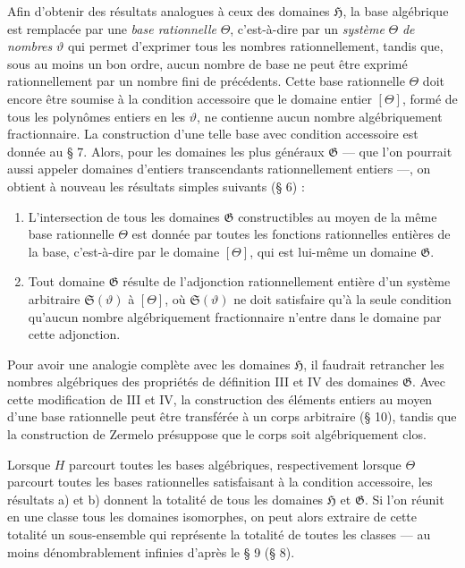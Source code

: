 Afin d'obtenir des résultats analogues à ceux des domaines $\mathfrak H$, la base algébrique est remplacée par une \emph{base rationnelle} $\Theta$, c'est-à-dire par un \emph{système} $\Theta$ \emph{de nombres} $\vartheta$ qui permet d'exprimer tous les nombres rationnellement, tandis que, sous au moins un bon ordre, aucun nombre de base ne peut être exprimé rationnellement par un nombre fini de précédents. Cette base rationnelle $\Theta$ doit encore être soumise à la condition accessoire que le domaine entier $[\Theta]$, formé de tous les polynômes entiers en les $\vartheta$, ne contienne aucun nombre algébriquement fractionnaire. La construction d'une telle base avec condition accessoire est donnée au \S{} 7. Alors, pour les domaines les plus généraux $\mathfrak G$ --- que l'on pourrait aussi appeler domaines d'entiers transcendants rationnellement entiers ---, on obtient à nouveau les résultats simples suivants (\S{} 6) :
\begin{enumerate}
\item[a)] L'intersection de tous les domaines $\mathfrak G$ constructibles au moyen de la même base rationnelle $\Theta$ est donnée par toutes les fonctions rationnelles entières de la base, c'est-à-dire par le domaine $[\Theta]$, qui est lui-même un domaine $\mathfrak G$.
\item[b)] Tout domaine $\mathfrak G$ résulte de l'adjonction rationnellement entière d'un système arbitraire $\mathfrak S(\vartheta)$ à $[\Theta]$, où $\mathfrak S(\vartheta)$ ne doit satisfaire qu'à la seule condition qu'aucun nombre algébriquement fractionnaire n'entre dans le domaine par cette adjonction.
\end{enumerate}

Pour avoir une analogie complète avec les domaines $\mathfrak H$, il faudrait retrancher les nombres algébriques des propriétés de définition III et IV des domaines $\mathfrak G$. Avec cette modification de III et IV, la construction des éléments entiers au moyen d'une base rationnelle peut être transférée à un corps arbitraire (\S{} 10), tandis que la construction de Zermelo présuppose que le corps soit algébriquement clos.

Lorsque $H$ parcourt toutes les bases algébriques, respectivement lorsque $\Theta$ parcourt toutes les bases rationnelles satisfaisant à la condition accessoire, les résultats a) et b) donnent la totalité de tous les domaines $\mathfrak H$ et $\mathfrak G$. Si l'on réunit en une classe tous les domaines isomorphes, on peut alors extraire de cette totalité un sous-ensemble qui représente la totalité de toutes les classes --- au moins dénombrablement infinies d'après le \S{} 9 (\S{} 8).

